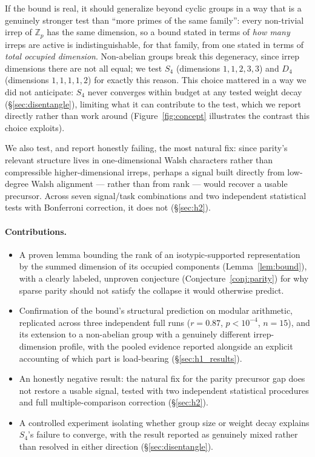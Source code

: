 \documentclass{article}
\begin{document}
If the bound is real, it should generalize beyond cyclic groups in a way
that is a genuinely stronger test than ``more primes of the same
family'': every non-trivial irrep of $\mathbb{Z}_p$ has the same
dimension, so a bound stated in terms of \emph{how many} irreps are
active is indistinguishable, for that family, from one stated in terms of
\emph{total occupied dimension}. Non-abelian groups break this
degeneracy, since irrep dimensions there are not all equal; we test $S_4$
(dimensions $1,1,2,3,3$) and $D_4$ (dimensions $1,1,1,1,2$) for exactly
this reason. This choice mattered in a way we did not anticipate: $S_4$
never converges within budget at any tested weight decay
(\S\ref{sec:disentangle}), limiting what it can contribute to the test,
which we report directly rather than work around (Figure~\ref{fig:concept}
illustrates the contrast this choice
exploits).

We also test, and report honestly failing, the most natural fix: since
parity's relevant structure lives in one-dimensional Walsh characters rather
than compressible higher-dimensional irreps, perhaps a signal built directly
from low-degree Walsh alignment --- rather than from rank --- would recover
a usable precursor. Across seven signal/task combinations and two
independent statistical tests with Bonferroni correction, it does not
(\S\ref{sec:h2}).

\paragraph{Contributions.}
\begin{itemize}
  \item A proven lemma bounding the rank of an isotypic-supported
  representation by the summed dimension of its occupied components
  (Lemma~\ref{lem:bound}), with a clearly labeled, unproven conjecture
  (Conjecture~\ref{conj:parity}) for why sparse parity should not satisfy
  the collapse it would otherwise predict.
  \item Confirmation of the bound's structural prediction on modular
  arithmetic, replicated across three independent full runs ($r=0.87$,
  $p<10^{-4}$, $n=15$), and its extension to a non-abelian group with a
  genuinely different irrep-dimension profile, with the pooled evidence
  reported alongside an explicit accounting of which part is load-bearing
  (\S\ref{sec:h1_results}).
  \item An honestly negative result: the natural fix for the parity
  precursor gap does not restore a usable signal, tested with two
  independent statistical procedures and full multiple-comparison
  correction (\S\ref{sec:h2}).
  \item A controlled experiment isolating whether group size or weight
  decay explains $S_4$'s failure to converge, with the result reported as
  genuinely mixed rather than resolved in either direction
  (\S\ref{sec:disentangle}).
\end{itemize}
\end{document}
